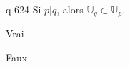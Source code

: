\begin{truefalse}{q-624}
Si $p|q$, alors $\mathbb U_q \subset  \mathbb U_p$.
\item Vrai
\item* Faux
\end{truefalse}

